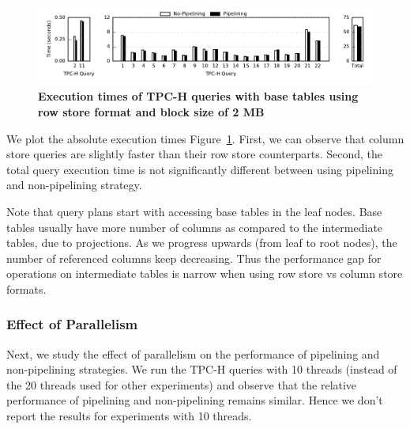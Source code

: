 \begin{figure}
	\centering 
	\includegraphics{pipeline/figures/rowstore-20threads-bs2mb-withlip-alltpch}
	\caption{\textbf{Execution times of TPC-H queries with base tables using row store format and block size of 2 MB}}
	\label{fig:absolute-times-all-tpch-bs2mb-20threads-rowstore}
\end{figure}

We plot the absolute execution times Figure~\ref{fig:absolute-times-all-tpch-bs2mb-20threads-rowstore}.
First, we can observe that column store queries are slightly faster than their row store counterparts. 
Second, the total query execution time is not significantly different between using pipelining and non-pipelining strategy. 

Note that query plans start with accessing base tables in the leaf nodes. 
Base tables usually have more number of columns as compared to the intermediate tables, due to projections.
As we progress upwards (from leaf to root nodes), the number of referenced columns keep decreasing. 
Thus the performance gap for operations on intermediate tables is narrow when using row store vs column store formats.

\subsubsection{Effect of Parallelism}\label{sssec:parallelism-effect}
Next, we study the effect of parallelism on the performance of pipelining and non-pipelining strategies. 
We run the TPC-H queries with 10 threads (instead of the 20 threads used for other experiments) and observe that the relative performance of pipelining and non-pipelining remains similar. 
Hence we don't report the results for experiments with 10 threads.

